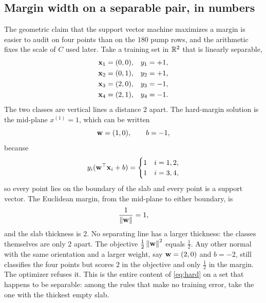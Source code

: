 \subsection{Margin width on a separable pair, in numbers}
\label{sec:margintoy}

The geometric claim that the support vector machine maximizes a margin is easier to audit on four points than on the \(180\) pump rows, and the arithmetic fixes the scale of \(C\) used later.
Take a training set in \(\mathbb{R}^{2}\) that is linearly separable,
\begin{equation}
\begin{aligned}
\mathbf{x}_{1}&=(0,0),& y_{1}&=+1,\\
\mathbf{x}_{2}&=(0,1),& y_{2}&=+1,\\
\mathbf{x}_{3}&=(2,0),& y_{3}&=-1,\\
\mathbf{x}_{4}&=(2,1),& y_{4}&=-1.
\end{aligned}
\label{eq:toyset}
\end{equation}
The two classes are vertical lines a distance \(2\) apart.
The hard-margin solution is the mid-plane \(x^{(1)}=1\), which can be written
\begin{equation}
\mathbf{w}=(1,0),\qquad b=-1,
\label{eq:toysol}
\end{equation}
because
\begin{equation}
y_{i}(\mathbf{w}^{\top}\mathbf{x}_{i}+b)
=
\begin{cases}
1 & i=1,2,\\
1 & i=3,4,
\end{cases}
\label{eq:toymargin}
\end{equation}
so every point lies on the boundary of the slab and every point is a support vector.
The Euclidean margin, from the mid-plane to either boundary, is
\begin{equation}
\frac{1}{\left\lVert \mathbf{w} \right\rVert}=1,
\label{eq:toym}
\end{equation}
and the slab thickness is \(2\).
No separating line has a larger thickness: the classes themselves are only \(2\) apart.
The objective \(\tfrac12\left\lVert \mathbf{w} \right\rVert^{2}\) equals \(\tfrac12\).
Any other normal with the same orientation and a larger weight, say \(\mathbf{w}=(2,0)\) and \(b=-2\), still classifies the four points but scores \(2\) in the objective and only \(\tfrac12\) in the margin.
The optimizer refuses it.
This is the entire content of \eqref{eq:hard} on a set that happens to be separable: among the rules that make no training error, take the one with the thickest empty slab.

